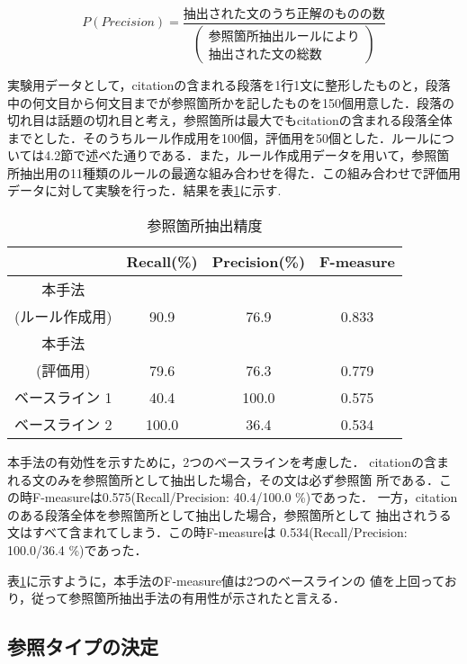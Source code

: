 \begin{equation}
 P(Precision) = 
 \frac{
  抽出された文のうち正解のものの数
 }{
 \left(
 \begin{array}{l}
  参照箇所抽出ルールにより\\
  抽出された文の総数
 \end{array}
 \right)
 }
\end{equation}

実験用データとして，citationの含まれる段落を1行1文に整形したものと，段落
中の何文目から何文目までが参照箇所かを記したものを150個用意した．段落の
切れ目は話題の切れ目と考え，参照箇所は最大でもcitationの含まれる段落全体
までとした．そのうちルール作成用を100個，評価用を50個とした．ルールにつ
いては4.2節で述べた通りである．また，ルール作成用データを用いて，参照箇
所抽出用の11種類のルールの最適な組み合わせを得た．この組み合わせで評価用
データに対して実験を行った．結果を表\ref{table:5_3}に示す.

\begin{table}[t]
\caption{参照箇所抽出精度\label{table:5_3}}
\begin{center}
\begin{tabular}{|c|c|c||c|}\hline
 & Recall(\%) & Precision(\%) & F-measure \\ \hline\hline
 本手法 & & & \\
 (ルール作成用) & 90.9 & 76.9 & 0.833 \\
 本手法 & & & \\
 (評価用) & 79.6 & 76.3 & 0.779 \\
 ベースライン 1 & 40.4 & 100.0 & 0.575 \\
 ベースライン 2 & 100.0 & 36.4 & 0.534 \\ \hline
\end{tabular}
\end{center}
\end{table}

本手法の有効性を示すために，2つのベースラインを考慮した．
citationの含まれる文のみを参照箇所として抽出した場合，その文は必ず参照箇
所である．この時F-measureは0.575(Recall/Precision: 40.4/100.0 \%)であった．
一方，citationのある段落全体を参照箇所として抽出した場合，参照箇所として
抽出されうる文はすべて含まれてしまう．この時F-measureは
0.534(Recall/Precision: 100.0/36.4 \%)であった．

表\ref{table:5_3}に示すように，本手法のF-measure値は2つのベースラインの
値を上回っており，従って参照箇所抽出手法の有用性が示されたと言える．



\subsection{参照タイプの決定}

